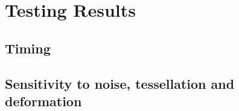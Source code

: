 \chapter{Testing Results}
\label{chapter:results}

\section{Timing}

\section{Sensitivity to noise, tessellation and deformation}

